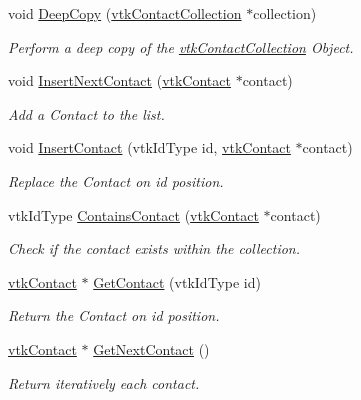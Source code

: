 \begin{DoxyCompactItemize}
\item 
void \hyperlink{classvtkContactCollection_ac35b5e32c81e6f21e4115591b282489a}{DeepCopy} (\hyperlink{classvtkContactCollection}{vtkContactCollection} $\ast$collection)
\begin{DoxyCompactList}\small\item\em Perform a deep copy of the \hyperlink{classvtkContactCollection}{vtkContactCollection} Object. \item\end{DoxyCompactList}\item 
void \hyperlink{classvtkContactCollection_a5ef415a23ede7e5f198a94380c9eec44}{InsertNextContact} (\hyperlink{classvtkContact}{vtkContact} $\ast$contact)
\begin{DoxyCompactList}\small\item\em Add a Contact to the list. \item\end{DoxyCompactList}\item 
void \hyperlink{classvtkContactCollection_a0e50a84b758bf14a4936fffb51a39287}{InsertContact} (vtkIdType id, \hyperlink{classvtkContact}{vtkContact} $\ast$contact)
\begin{DoxyCompactList}\small\item\em Replace the Contact on id position. \item\end{DoxyCompactList}\item 
vtkIdType \hyperlink{classvtkContactCollection_a4cb4194315844f6db614c37efcb069d0}{ContainsContact} (\hyperlink{classvtkContact}{vtkContact} $\ast$contact)
\begin{DoxyCompactList}\small\item\em Check if the contact exists within the collection. \item\end{DoxyCompactList}\item 
\hyperlink{classvtkContact}{vtkContact} $\ast$ \hyperlink{classvtkContactCollection_a0f3dcad137c9a1d088c1ca6585c2120c}{GetContact} (vtkIdType id)
\begin{DoxyCompactList}\small\item\em Return the Contact on id position. \item\end{DoxyCompactList}\item 
\hyperlink{classvtkContact}{vtkContact} $\ast$ \hyperlink{classvtkContactCollection_a4e9a9f6aec44e28433aaa02bb7aca941}{GetNextContact} ()
\begin{DoxyCompactList}\small\item\em Return iteratively each contact. \item\end{DoxyCompactList}\item 

\end{DoxyCompactItemize}
